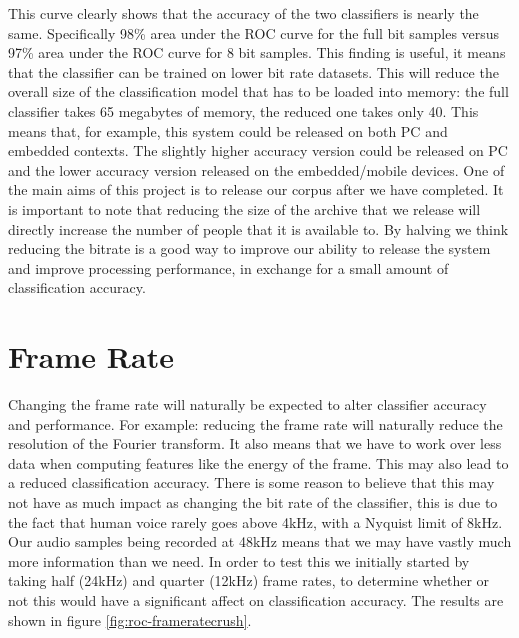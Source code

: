 \documentclass[ %
                    author={Sam Phippen},
                supervisor={Dr. Rafal Bogacz},
                     title={Real time voice activity detectors in noisy personal computing environments},
                  subtitle={},
                    degree={MEng},
                      year={2012} ]{thesis}
\begin{document}
This curve clearly shows that the accuracy of the two classifiers is nearly the
same. Specifically 98\% area under the ROC curve for the full bit samples
versus 97\% area under the ROC curve for 8 bit samples. This finding is useful,
it means that the classifier can be trained on lower bit rate datasets. This
will reduce the overall size of the classification model that has to be loaded
into memory: the full classifier takes 65 megabytes of memory, the reduced one
takes only 40.  This means that, for example, this system could be released on
both PC and embedded contexts. The slightly higher accuracy version could be
released on PC and the lower accuracy version released on the embedded/mobile
devices. One of the main aims of this project is to release our corpus after we
have completed.  It is important to note that reducing the size of the archive
that we release will directly increase the number of people that it is
available to. By halving we think reducing the bitrate is a good way to improve
our ability to release the system and improve processing performance, in exchange
for a small amount of classification accuracy.

\section{Frame Rate}

Changing the frame rate will naturally be expected to alter classifier accuracy
and performance. For example: reducing the frame rate will naturally reduce the
resolution of the Fourier transform. It also means that we have to work over
less data when computing features like the energy of the frame. This may also
lead to a reduced classification accuracy. There is some reason to believe that
this may not have as much impact as changing the bit rate of the classifier,
this is due to the fact that human voice rarely goes above 4kHz, with a
Nyquist limit of 8kHz. Our audio samples being recorded at 48kHz means that
we may have vastly much more information than we need. In order to test this we
initially started by taking half (24kHz) and quarter (12kHz) frame rates,
to determine whether or not this would have a significant affect on
classification accuracy. The results are shown in figure
\ref{fig:roc-frameratecrush}.
\end{document}

